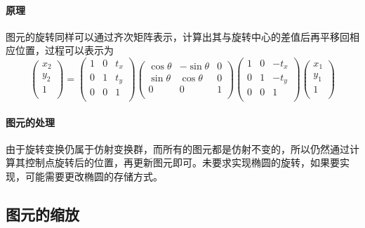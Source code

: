 \documentclass[a4paper,UTF8]{article}
\theoremstyle{definition}
\begin{document}
\paragraph{原理} 图元的旋转同样可以通过齐次矩阵表示，计算出其与旋转中心的差值后再平移回相应位置，过程可以表示为\cite{homographyBook}
\begin{equation}
\left(
\begin{array}{c}
x_2 \\
y_2 \\
1 \\
\end{array}
\right)
=
\left(
\begin{array}{ccc}
1 & 0 & t_x \\
0 & 1 & t_y \\
0 & 0 & 1 \\
\end{array}
\right)
\left(
\begin{array}{ccc}
\cos\theta & -\sin\theta & 0 \\
\sin\theta & \cos\theta & 0 \\
0 & 0 & 1 \\
\end{array}
\right)
\left(
\begin{array}{ccc}
1 & 0 & -t_x \\
0 & 1 & -t_y \\
0 & 0 & 1 \\
\end{array}
\right)
\left(
\begin{array}{c}
x_1 \\
y_1 \\
1 \\
\end{array}
\right)
\end{equation}
\paragraph{图元的处理} 由于旋转变换仍属于仿射变换群，而所有的图元都是仿射不变的，所以仍然通过计算其控制点旋转后的位置，再更新图元即可。未要求实现椭圆的旋转，如果要实现，可能需要更改椭圆的存储方式。
\subsection{图元的缩放}
\end{document}
